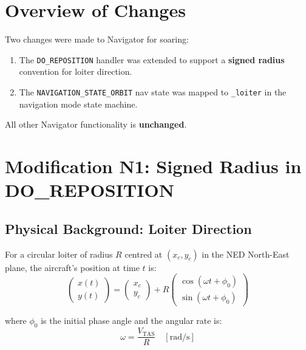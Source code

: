 \documentclass[12pt,a4paper]{article}
\begin{document}
\section{Overview of Changes}

Two changes were made to Navigator for soaring:
\begin{enumerate}
  \item The \texttt{DO\_REPOSITION} handler was extended to support a
        \textbf{signed radius} convention for loiter direction.
  \item The \texttt{NAVIGATION\_STATE\_ORBIT} nav state was mapped to
        \texttt{\_loiter} in the navigation mode state machine.
\end{enumerate}
All other Navigator functionality is \textbf{unchanged}.

\section{Modification N1: Signed Radius in DO\_REPOSITION}

\subsection{Physical Background: Loiter Direction}

For a circular loiter of radius $R$ centred at $(x_c, y_c)$ in the NED
North-East plane, the aircraft's position at time $t$ is:
\begin{equation}
  \begin{pmatrix} x(t) \\ y(t) \end{pmatrix}
  = \begin{pmatrix} x_c \\ y_c \end{pmatrix}
  + R \begin{pmatrix} \cos(\omega t + \phi_0) \\ \sin(\omega t + \phi_0) \end{pmatrix}
\end{equation}

where $\phi_0$ is the initial phase angle and the angular rate is:
\begin{equation}
  \omega = \frac{V_{\text{TAS}}}{R} \quad [\text{rad/s}]
\end{equation}
\end{document}
